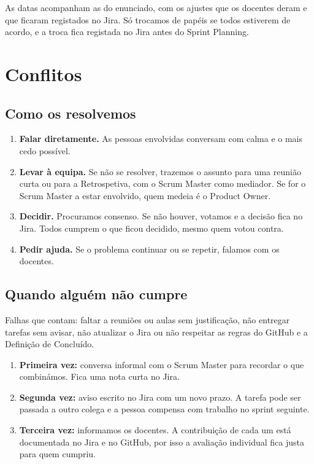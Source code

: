 \documentclass[11pt,a4paper]{article}
\begin{document}
As datas acompanham as do enunciado, com os ajustes que os docentes deram e que ficaram registados no Jira. Só trocamos de papéis se todos estiverem de acordo, e a troca fica registada no Jira antes do Sprint Planning.

\section{Conflitos}

\subsection{Como os resolvemos}

\begin{enumerate}
  \item \textbf{Falar diretamente.} As pessoas envolvidas conversam com calma e o mais cedo possível.
  \item \textbf{Levar à equipa.} Se não se resolver, trazemos o assunto para uma reunião curta ou para a Retrospetiva, com o Scrum Master como mediador. Se for o Scrum Master a estar envolvido, quem medeia é o Product Owner.
  \item \textbf{Decidir.} Procuramos consenso. Se não houver, votamos e a decisão fica no Jira. Todos cumprem o que ficou decidido, mesmo quem votou contra.
  \item \textbf{Pedir ajuda.} Se o problema continuar ou se repetir, falamos com os docentes.
\end{enumerate}

\subsection{Quando alguém não cumpre}

Falhas que contam: faltar a reuniões ou aulas sem justificação, não entregar tarefas sem avisar, não atualizar o Jira ou não respeitar as regras do GitHub e a Definição de Concluído.

\begin{enumerate}
  \item \textbf{Primeira vez:} conversa informal com o Scrum Master para recordar o que combinámos. Fica uma nota curta no Jira.
  \item \textbf{Segunda vez:} aviso escrito no Jira com um novo prazo. A tarefa pode ser passada a outro colega e a pessoa compensa com trabalho no sprint seguinte.
  \item \textbf{Terceira vez:} informamos os docentes. A contribuição de cada um está documentada no Jira e no GitHub, por isso a avaliação individual fica justa para quem cumpriu.
\end{enumerate}
\end{document}

